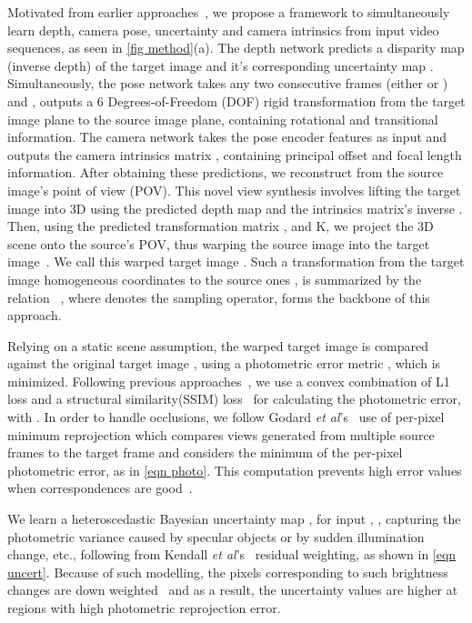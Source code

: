 \documentclass{bmvc2k}
\def\etal{\emph{et al}\bmvaOneDot}
\begin{document}
Motivated from earlier approaches~\cite{godard2019digging,gordon2019depth}, we propose a framework to simultaneously learn depth, camera pose, uncertainty and camera intrinsics from input video sequences, as seen in \autoref{fig method}(a). The depth network predicts a disparity map (inverse depth)  of the target image  and it's corresponding uncertainty map . Simultaneously, the pose network takes any two consecutive frames  (either  or ) and , outputs a 6 Degrees-of-Freedom (DOF) rigid transformation  from the target image plane to the source image plane, containing rotational  and transitional  information.
The camera network takes the pose encoder features as input and outputs the camera intrinsics matrix , containing principal offset and focal length information. After obtaining these predictions, we reconstruct  from the source image's point of view (POV). This novel view synthesis involves lifting the target image into 3D using the predicted depth map  and the intrinsics matrix's inverse . Then, using the predicted transformation matrix , and K, we project the 3D scene onto the source's POV, thus warping the source image into the target image~\cite{zhou2017unsupervised, godard2019digging}. We call this warped target image . Such a transformation from the target image homogeneous coordinates  to the source ones , is summarized by the relation ~\cite{zhou2017unsupervised}, where  denotes the sampling operator, forms the backbone of this approach.

Relying on a static scene assumption, the warped target image  is compared against the original target image , using a photometric error metric , which is minimized. Following previous approaches~\cite{zhou2017unsupervised, godard2019digging}, we use a convex combination of L1 loss and a structural similarity(SSIM) loss~\cite{wang2004image} for calculating the photometric error, with . In order to handle occlusions, we follow Godard \etal's~\cite{godard2019digging} use of per-pixel minimum reprojection which compares views generated from multiple source frames to the target frame and considers the minimum of the per-pixel photometric error, as in \autoref{eqn photo}. This computation prevents high error values when correspondences are good~\cite{godard2019digging}.



We learn a heteroscedastic Bayesian uncertainty map , for input , , capturing the photometric variance caused by specular objects or by sudden illumination change, etc., following from Kendall \etal's~\cite{kendall2018multi} residual weighting, as shown in \autoref{eqn uncert}. Because of such modelling, the pixels corresponding to such brightness changes are down weighted~\cite{yang2020d3vo} and as a result, the uncertainty values are higher at regions with high photometric reprojection error. 
\end{document}
